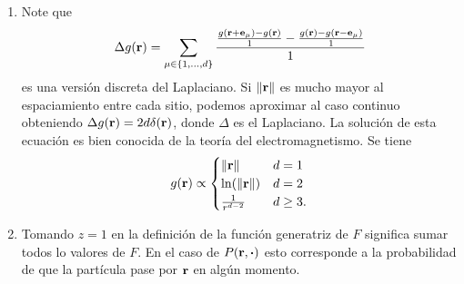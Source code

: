 \documentclass{article}
\begin{document}
\begin{enumerate}
\item Note que
\begin{equation}
\Delta g(\vb{r})=\sum_{\mu\in\{1,\dots,d\}}\frac{\frac{g(\vb{r}+\vb{e}_\mu)-g(\vb{r})}{1}-\frac{g(\vb{r})-g(\vb{r}-\vb{e}_\mu)}{1}}{1}
\end{equation} 
es una versión discreta del Laplaciano. Si $\|\vb{r}\|$ es mucho mayor al espaciamiento entre cada sitio, podemos aproximar al caso continuo obteniendo $\Delta g(\vb{r})=2d\delta(\vb{r})$, donde $\Delta$ es el Laplaciano. La solución de esta ecuación es bien conocida de la teoría del electromagnetismo. Se tiene
\begin{equation}
g(\vb{r})\propto\begin{cases}
\|\vb{r}\| & d=1\\
\ln(\|\vb{r}\|) & d=2\\
\frac{1}{r^{d-2}} & d\geq 3.
\end{cases}
\end{equation}

\item Tomando $z=1$ en la definición de la función generatriz de $F$ significa sumar todos lo valores de $F$. En el caso de $P(\vb{r},\vdot)$ esto corresponde a la probabilidad de que la partícula pase por $\vb{r}$ en algún momento. 

\end{enumerate}



\end{document}
